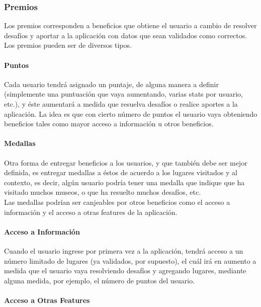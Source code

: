 \documentclass[10pt,letterpaper]{article}
\begin{document}
\subsubsection{Premios}

Los premios corresponden a beneficios que obtiene el usuario a cambio de resolver desafíos y aportar a la aplicación con datos que sean validados como correctos. Los premios pueden ser de diversos tipos.\\

\paragraph{Puntos}

Cada usuario tendrá asignado un puntaje, de alguna manera a definir (simplemente una puntuación que vaya aumentando, varias stats por usuario, etc.), y éste aumentará a medida que resuelva desafíos o realice aportes a la aplicación. La idea es que con cierto número de puntos el usuario vaya obteniendo beneficios tales como mayor acceso a información u otros beneficios.\\

\paragraph{Medallas}

Otra forma de entregar beneficios a los usuarios, y que también debe ser mejor definida, es entregar medallas a éstos de acuerdo a los lugares visitados y al contexto, es decir, algún usuario podría tener una medalla que indique que ha visitado muchos museos, o que ha resuelto muchos desafíos, etc.\\

Las medallas podrían ser canjeables por otros beneficios como el acceso a información y el acceso a otras features de la aplicación.\\

\paragraph{Acceso a Información}

Cuando el usuario ingrese por primera vez a la aplicación, tendrá acceso a un número limitado de lugares (ya validados, por supuesto), el cuál irá en aumento a medida que el usuario vaya resolviendo desafíos y agregando lugares, mediante alguna medida, por ejemplo, el número de puntos del usuario.

\paragraph{Acceso a Otras Features}
\end{document}
